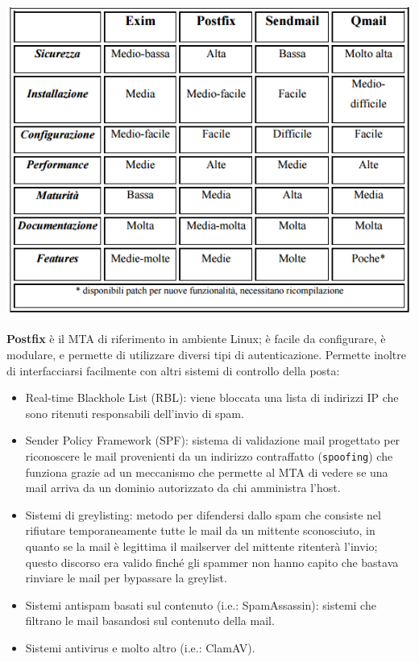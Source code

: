 \documentclass[a4paper]{report}
\begin{document}
\begin{center}
\includegraphics[scale=0.62]{confrontomta.png}
\end{center}
\textbf{Postfix} è il MTA di riferimento in ambiente Linux; è facile da configurare, è modulare, e permette di utilizzare diversi tipi di autenticazione. Permette inoltre di interfacciarsi facilmente con altri sistemi di controllo della posta:
\begin{itemize}
\item Real-time Blackhole List (RBL): viene bloccata una lista di indirizzi IP che sono ritenuti responsabili dell'invio di spam.
\item Sender Policy Framework (SPF): sistema di validazione mail progettato per riconoscere le mail provenienti da un indirizzo contraffatto (\texttt{spoofing}) che funziona grazie ad un meccanismo che permette al MTA di vedere se una mail arriva da un dominio autorizzato da chi amministra l'host.
\item Sistemi di greylisting: metodo per difendersi dallo spam che consiste nel rifiutare temporaneamente tutte le mail da un mittente sconosciuto, in quanto se la mail è legittima il mailserver del mittente ritenterà l'invio; questo discorso era valido finché gli spammer non hanno capito che bastava rinviare le mail per bypassare la greylist.
\item Sistemi antispam basati sul contenuto (i.e.: SpamAssassin): sistemi che filtrano le mail basandosi sul contenuto della mail.
\item Sistemi antivirus e molto altro (i.e.: ClamAV).
\end{itemize}
\end{document}
